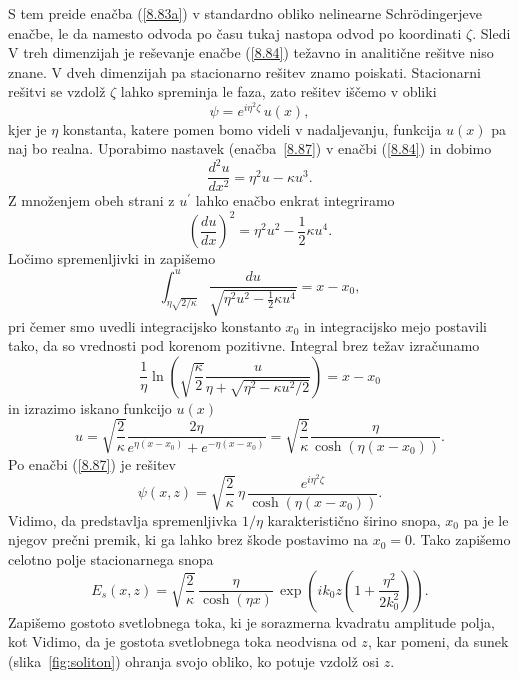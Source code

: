  S tem preide enačba (\ref{8.83a}) v standardno obliko nelinearne Schr\"odingerjeve
enačbe, le da namesto odvoda po času tukaj nastopa odvod po koordinati $\zeta$. Sledi
V treh dimenzijah je reševanje enačbe (\ref{8.84}) težavno in analitične
rešitve niso znane. V dveh dimenzijah pa stacionarno rešitev znamo
poiskati. Stacionarni rešitvi se vzdolž $\zeta$ lahko spreminja le faza, zato
rešitev iščemo v obliki 
\begin{equation}
\psi=e^{i\eta^{2}\zeta}\, u(x),
\label{8.87}
\end{equation}
 kjer je $\eta$ konstanta, katere pomen bomo videli v nadaljevanju, 
 funkcija $u(x)$ pa naj bo realna. 
Uporabimo nastavek (enačba~\ref{8.87}) v enačbi (\ref{8.84}) in dobimo
\begin{equation}
\frac{d^{2}u}{dx^{2}}=\eta^{2}u-\kappa u^{3}.
\end{equation}
 Z množenjem obeh strani z $u^{\prime}$ lahko enačbo enkrat integriramo
\begin{equation}
\left(\frac{du}{dx}\right)^{2}=\eta^{2}u^{2}-\frac{1}{2}\kappa u^{4}.
\end{equation}
Ločimo spremenljivki in zapišemo 
\begin{equation}
\int_{\eta\sqrt{2/\kappa}}^{u}\frac{du}{\sqrt{\eta^{2}u^2-\frac{1}{2}\kappa u^{4}}}=x-x_{0},
\label{8.85}
\end{equation}
pri čemer smo uvedli integracijsko konstanto $x_{0}$ in integracijsko mejo postavili 
tako, da so vrednosti pod korenom pozitivne.
Integral brez težav izračunamo
\begin{equation}
\frac{1}{\eta}\ln\left(\sqrt{\frac{\kappa}{2}}\frac{u}{\eta+
\sqrt{\eta^{2}-\kappa u^{2}/2}}\right)=x-x_{0}
\end{equation}
in izrazimo iskano funkcijo $u(x)$
\begin{equation}
u=\sqrt{\frac{2}{\kappa}}\frac{2 \eta }{e^{\eta(x-x_{0})}+e^{-\eta(x-x_{0})}}=
\sqrt{\frac{2}{\kappa}}\frac{\eta}{\cosh \left(\eta(x-x_{0})\right)}.
\label{8.86}
\end{equation}
Po enačbi (\ref{8.87}) je rešitev
\begin{equation}
\psi(x,z)=\sqrt{\frac{2}{\kappa}}\,\eta\,\frac{e^{i\eta^{2}\zeta}}{\cosh \left(\eta(x-x_{0})\right)}.
\label{8.88}
\end{equation}
Vidimo, da predstavlja spremenljivka $1/\eta$  karakteristično širino snopa, $x_{0}$ pa
je le njegov prečni premik, ki ga lahko brez škode postavimo na $x_0=0$. Tako
zapišemo celotno polje stacionarnega snopa 
\begin{equation}
E_{s}(x,z)=\sqrt{\frac{2}{\kappa}}\,\frac{\eta}{\cosh(\eta x)}\,\exp\left(ik_{0}z\left(1+
\frac{\eta^{2}}{2k_{0}^{2}}\right)\right).
\label{8.89}
\end{equation}
Zapišemo gostoto svetlobnega toka, ki je sorazmerna 
kvadratu amplitude polja, kot
Vidimo, da je gostota svetlobnega toka neodvisna od $z$, kar pomeni, da sunek 
(slika~\ref{fig:soliton}) ohranja svojo obliko, ko potuje vzdolž osi $z$.

